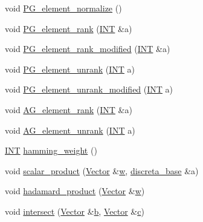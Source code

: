 \begin{DoxyCompactItemize}
\item 
void \mbox{\hyperlink{class_vector_a8cca2f9cb0336c06d2ab0b6f835ceb82}{P\+G\+\_\+element\+\_\+normalize}} ()
\item 
void \mbox{\hyperlink{class_vector_a0dedd5c9b487e5160589e2b312091246}{P\+G\+\_\+element\+\_\+rank}} (\mbox{\hyperlink{galois_8h_a09fddde158a3a20bd2dcadb609de11dc}{I\+NT}} \&a)
\item 
void \mbox{\hyperlink{class_vector_a7d29be1c56b7eb6711b79a25c1755290}{P\+G\+\_\+element\+\_\+rank\+\_\+modified}} (\mbox{\hyperlink{galois_8h_a09fddde158a3a20bd2dcadb609de11dc}{I\+NT}} \&a)
\item 
void \mbox{\hyperlink{class_vector_a8461aafe0c57317eea2df6e3b6507995}{P\+G\+\_\+element\+\_\+unrank}} (\mbox{\hyperlink{galois_8h_a09fddde158a3a20bd2dcadb609de11dc}{I\+NT}} a)
\item 
void \mbox{\hyperlink{class_vector_a778c7effcf9ce1c1f9187f2649955e26}{P\+G\+\_\+element\+\_\+unrank\+\_\+modified}} (\mbox{\hyperlink{galois_8h_a09fddde158a3a20bd2dcadb609de11dc}{I\+NT}} a)
\item 
void \mbox{\hyperlink{class_vector_a7309e3b8eb7e188001857c1728d43a70}{A\+G\+\_\+element\+\_\+rank}} (\mbox{\hyperlink{galois_8h_a09fddde158a3a20bd2dcadb609de11dc}{I\+NT}} \&a)
\item 
void \mbox{\hyperlink{class_vector_aa2960a2b59352dcaaf661b81acc65d3b}{A\+G\+\_\+element\+\_\+unrank}} (\mbox{\hyperlink{galois_8h_a09fddde158a3a20bd2dcadb609de11dc}{I\+NT}} a)
\item 
\mbox{\hyperlink{galois_8h_a09fddde158a3a20bd2dcadb609de11dc}{I\+NT}} \mbox{\hyperlink{class_vector_a53a1b391aad5db6fe6af3b67781f87cf}{hamming\+\_\+weight}} ()
\item 
void \mbox{\hyperlink{class_vector_acb27c83b81fc462996cca982f0c6f07c}{scalar\+\_\+product}} (\mbox{\hyperlink{class_vector}{Vector}} \&\mbox{\hyperlink{alphabet2_8_c_aac374e320caaadeca4874add33b62af2}{w}}, \mbox{\hyperlink{classdiscreta__base}{discreta\+\_\+base}} \&a)
\item 
void \mbox{\hyperlink{class_vector_a36312785f92e4dfb892cdb85c4444247}{hadamard\+\_\+product}} (\mbox{\hyperlink{class_vector}{Vector}} \&\mbox{\hyperlink{alphabet2_8_c_aac374e320caaadeca4874add33b62af2}{w}})
\item 
void \mbox{\hyperlink{class_vector_a0f89a3100b71befddf7adfbd2369b3f4}{intersect}} (\mbox{\hyperlink{class_vector}{Vector}} \&\mbox{\hyperlink{alphabet2_8_c_a148e3876077787926724625411d6e7a9}{b}}, \mbox{\hyperlink{class_vector}{Vector}} \&\mbox{\hyperlink{alphabet2_8_c_a4e1e0e72dd773439e333c84dd762a9c3}{c}})

\end{DoxyCompactItemize}
